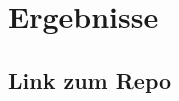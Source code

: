 
\section{Ergebnisse}
\label{sec:Ergebnisse}

\subsection{Link zum Repo}
\label{subsec:Link zum Repo}
\cite{GitHub-Repo}